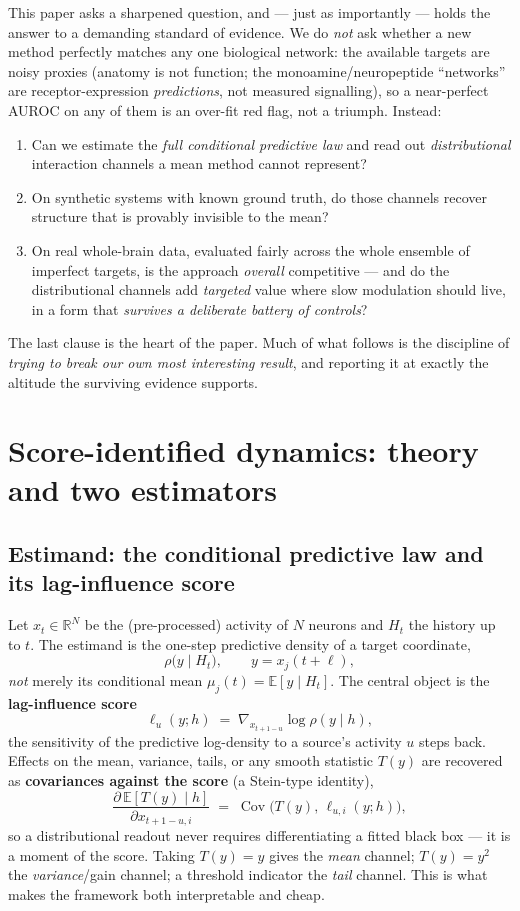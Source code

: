 \documentclass[11pt]{article}
\newcommand{\Cov}{\operatorname{Cov}}
\newcommand{\R}{\mathbb{R}}
\newcommand{\E}{\mathbb{E}}
\newcommand{\Hcal}{H}
\begin{document}
This paper asks a sharpened question, and --- just as importantly --- holds the answer to a
demanding standard of evidence. We do \emph{not} ask whether a new method perfectly matches any one
biological network: the available targets are noisy proxies (anatomy is not function; the
monoamine/neuropeptide ``networks'' are receptor-expression \emph{predictions}, not measured
signalling), so a near-perfect AUROC on any of them is an over-fit red flag, not a triumph. Instead:
\begin{enumerate}[topsep=2pt,itemsep=1pt]
  \item Can we estimate the \emph{full conditional predictive law} and read out \emph{distributional}
        interaction channels a mean method cannot represent?
  \item On synthetic systems with known ground truth, do those channels recover structure that is
        provably invisible to the mean?
  \item On real whole-brain data, evaluated fairly across the whole ensemble of imperfect targets,
        is the approach \emph{overall} competitive --- and do the distributional channels add
        \emph{targeted} value where slow modulation should live, in a form that \emph{survives a
        deliberate battery of controls}?
\end{enumerate}
The last clause is the heart of the paper. Much of what follows is the discipline of \emph{trying to
break our own most interesting result}, and reporting it at exactly the altitude the surviving
evidence supports.

\section{Score-identified dynamics: theory and two estimators}
\label{sec:theory}

\subsection{Estimand: the conditional predictive law and its lag-influence score}
Let $x_t\in\R^N$ be the (pre-processed) activity of $N$ neurons and $\Hcal_t$ the history up to $t$.
The estimand is the one-step predictive density of a target coordinate,
\[
  \rho\bigl(y \mid \Hcal_t\bigr), \qquad y = x_{j}(t{+}\ell),
\]
\emph{not} merely its conditional mean $\mu_j(t)=\E[y\mid\Hcal_t]$. The central object is the
\textbf{lag-influence score}
\[
  \ell_u(y;h) \;=\; \nabla_{x_{t+1-u}}\log\rho(y\mid h),
\]
the sensitivity of the predictive log-density to a source's activity $u$ steps back. Effects on the
mean, variance, tails, or any smooth statistic $T(y)$ are recovered as \textbf{covariances against
the score} (a Stein-type identity),
\[
  \frac{\partial\,\E[T(y)\mid h]}{\partial x_{t+1-u,i}}
  \;=\; \Cov\!\bigl(T(y),\,\ell_{u,i}(y;h)\bigr),
\]
so a distributional readout never requires differentiating a fitted black box --- it is a moment of
the score. Taking $T(y)=y$ gives the \emph{mean} channel; $T(y)=y^2$ the \emph{variance}/gain
channel; a threshold indicator the \emph{tail} channel. This is what makes the framework both
interpretable and cheap.
\end{document}
